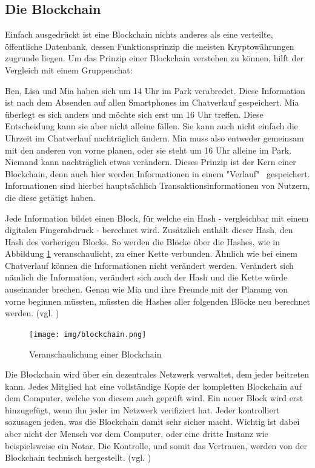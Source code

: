 \documentclass[oneside]{ausarbeitung}
\begin{document}
\subsection{Die Blockchain}
\label{sub:blockchain}

Einfach ausgedrückt ist eine Blockchain nichts anderes als eine
verteilte, öffentliche Datenbank\cite{blockchain_definition}, dessen
Funktionsprinzip die meisten Kryptowährungen zugrunde
liegen\cite{blockchain_1}.
Um das Prinzip einer Blockchain verstehen zu können, hilft der
Vergleich mit einem Gruppenchat:

Ben, Lisa und Mia haben sich um 14 Uhr im Park verabredet. Diese
Information ist nach dem Absenden auf allen Smartphones im Chatverlauf
gespeichert. Mia überlegt es sich anders und möchte sich erst um 16
Uhr treffen. Diese Entscheidung kann sie aber nicht alleine fällen.
Sie kann auch nicht einfach die Uhrzeit im Chatverlauf nachträglich
ändern. Mia muss also entweder gemeinsam mit den anderen von vorne
planen, oder sie steht um 16 Uhr alleine im Park. Niemand kann
nachträglich etwas verändern. Dieses Prinzip ist der Kern einer
Blockchain, denn auch hier werden Informationen in einem "Verlauf" \
gespeichert. Informationen sind hierbei hauptsächlich
Transaktionsinformationen von Nutzern, die diese getätigt haben.

Jede Information bildet einen Block, für welche ein Hash -
vergleichbar mit einem digitalen Fingerabdruck - berechnet wird.
Zusätzlich enthält dieser Hash, den Hash des vorherigen Blocks. So
werden die Blöcke über die Hashes, wie in Abbildung \ref{fig:4}
veranschaulicht, zu einer Kette verbunden. Ähnlich wie bei einem
Chatverlauf können die Informationen nicht verändert werden.
Verändert sich nämlich die Information, verändert sich auch der
Hash und die Kette würde auseinander brechen. Genau wie Mia und ihre
Freunde mit der Planung von vorne beginnen müssten, müssten die
Hashes aller folgenden Blöcke neu berechnet werden. (vgl.
\cite{blockchain})

\begin{figure}[H]
  \centering
  \texttt{[image: img/blockchain.png]}
  \caption{Veranschaulichung einer Blockchain\cite{blockchain}}
  \label{fig:4}
\end{figure} 

Die Blockchain wird über ein dezentrales Netzwerk verwaltet, dem
jeder beitreten kann. Jedes Mitglied hat eine vollständige Kopie der
kompletten Blockchain auf dem Computer, welche von diesem auch
geprüft wird. Ein neuer Block wird erst hinzugefügt, wenn ihn jeder
im Netzwerk verifiziert hat. Jeder kontrolliert sozusagen jeden, was
die Blockchain damit sehr sicher macht. Wichtig ist dabei aber nicht
der Mensch vor dem Computer, oder eine dritte Instanz wie
beispielsweise ein Notar. Die Kontrolle, und somit das Vertrauen,
werden von der Blockchain technisch hergestellt. (vgl.
\cite{blockchain})
\end{document}
